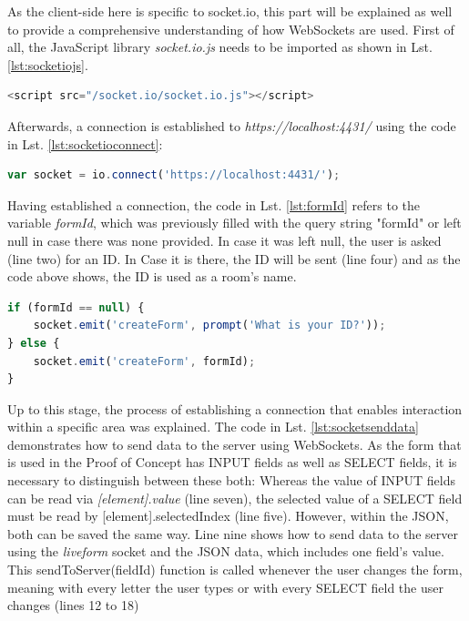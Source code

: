 As the client-side here is specific to socket.io, this part will be explained as well to provide a comprehensive understanding of how WebSockets are used. First of all, the JavaScript library \textit{socket.io.js} needs to be imported as shown in Lst. \ref{lst:socketiojs}.

\begin{lstlisting}[language=javascript,caption={Including the client-side socket.io JavaScript},label=lst:socketiojs]
<script src="/socket.io/socket.io.js"></script>
\end{lstlisting}

Afterwards, a connection is established to \textit{https://localhost:4431/} using the code in Lst. \ref{lst:socketioconnect}:

\begin{lstlisting}[language=javascript,caption={Establishing socket.io connection from the client-side},label=lst:socketioconnect]
var socket = io.connect('https://localhost:4431/');
\end{lstlisting}

Having established a connection, the code in Lst. \ref{lst:formId} refers to the variable \textit{formId}, which was previously filled with the query string "formId" or left null in case there was none provided. In case it was left null, the user is asked (line two) for an ID. In Case it is there, the ID will be sent (line four) and as the code above shows, the ID is used as a room's name.

\begin{lstlisting}[language=javascript,caption={Joining a specific area – "room"},label=lst:formId]
if (formId == null) {
	socket.emit('createForm', prompt('What is your ID?'));
} else {
	socket.emit('createForm', formId);
}
\end{lstlisting}

Up to this stage, the process of establishing a connection that enables interaction within a specific area was explained. The code in Lst. \ref{lst:socketsenddata} demonstrates how to send data to the server using WebSockets. As the form that is used in the Proof of Concept has INPUT fields as well as SELECT fields, it is necessary to distinguish between these both: Whereas the value of INPUT fields can be read via \textit{[element].value} (line seven), the selected value of a SELECT field must be read by [element].selectedIndex (line five). However, within the JSON, both can be saved the same way. Line nine shows how to send data to the server using the \textit{liveform} socket and the JSON data, which includes one field's value. This sendToServer(fieldId) function is called whenever the user changes the form, meaning with every letter the user types or with every SELECT field the user changes (lines 12 to 18)

